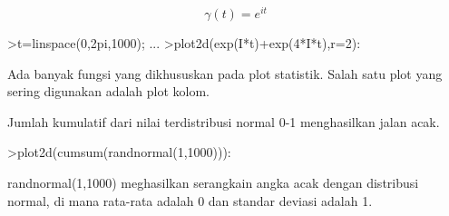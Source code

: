 \documentclass{article}
\begin{document}
\begin{eulernotebook}
\begin{eulercomment}
\begin{eulercomment}
\begin{eulercomment}
\begin{eulercomment}
\begin{eulercomment}
\begin{eulercomment}
\begin{eulercomment}
\begin{eulercomment}
\begin{eulercomment}
\begin{eulercomment}
\begin{eulercomment}
\begin{eulercomment}
\begin{eulercomment}
\end{eulercomment}
\begin{eulerformula}
\[
\gamma(t) = e^{it}
\]
\end{eulerformula}
\begin{eulerprompt}
>t=linspace(0,2pi,1000); ...
>plot2d(exp(I*t)+exp(4*I*t),r=2):
\end{eulerprompt}
\begin{eulercomment}
Ada banyak fungsi yang dikhususkan pada plot statistik. Salah satu
plot yang sering digunakan adalah plot kolom.

Jumlah kumulatif dari nilai terdistribusi normal 0-1 menghasilkan
jalan acak.
\end{eulercomment}
\begin{eulerprompt}
>plot2d(cumsum(randnormal(1,1000))):
\end{eulerprompt}
\begin{eulercomment}
randnormal(1,1000) meghasilkan serangkain angka acak dengan distribusi
normal, di mana rata-rata adalah 0 dan standar deviasi adalah 1.


\end{eulercomment}
\end{eulercomment}
\end{eulercomment}
\end{eulercomment}
\end{eulercomment}
\end{eulercomment}
\end{eulercomment}
\end{eulercomment}
\end{eulercomment}
\end{eulercomment}
\end{eulercomment}
\end{eulercomment}
\end{eulercomment}
\end{eulernotebook}
\end{document}
